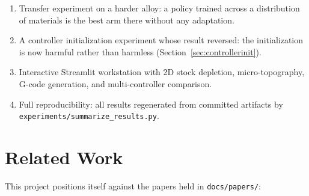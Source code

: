 \documentclass[11pt,a4paper]{article}
\begin{document}
\begin{enumerate}
    \item Transfer experiment on a harder alloy: a policy trained across a distribution of materials is the best arm there without any adaptation.
    \item A controller initialization experiment whose result reversed: the initialization is now harmful rather than harmless (Section~\ref{sec:controllerinit}).
    \item Interactive Streamlit workstation with 2D stock depletion, micro-topography, G-code generation, and multi-controller comparison.
    \item Full reproducibility: all results regenerated from committed artifacts by\\
    \texttt{experiments/summarize\_results.py}.
\end{enumerate}

\section{Related Work}

This project positions itself against the papers held in \texttt{docs/papers/}:
\end{document}
